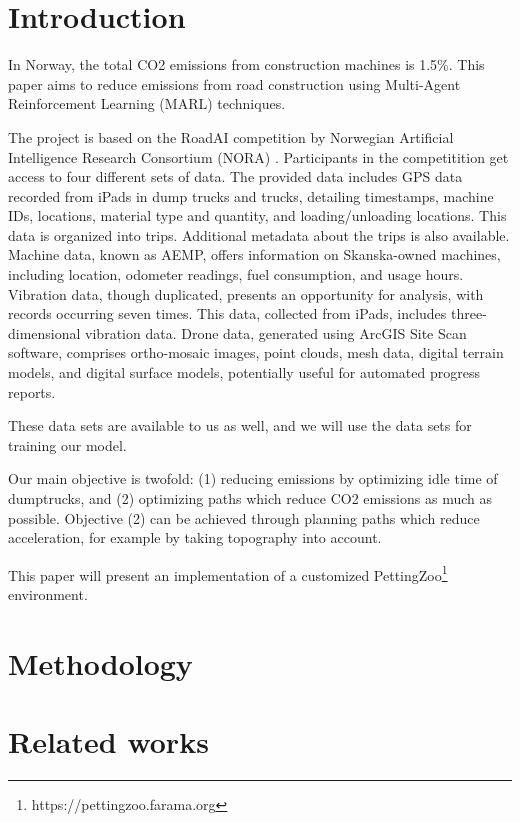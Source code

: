 \documentclass[conference]{IEEEtran}
\begin{document}
\section{Introduction}
In Norway, the total CO2 emissions from construction machines is 1.5\%. \cite{noraRoadAIReducing}
This paper aims to reduce emissions from road construction using Multi-Agent Reinforcement Learning
(MARL) techniques.

The project is based on the RoadAI competition by Norwegian Artificial Intelligence Research
Consortium (NORA) \cite{noraRoadAIReducing}. Participants in the competitition get access to four
different sets of data. The provided data includes GPS data recorded from iPads in dump trucks and
trucks, detailing timestamps, machine IDs, locations, material type and quantity, and loading/unloading
locations. This data is organized into trips. Additional metadata about the trips is also available.
Machine data, known as AEMP, offers information on Skanska-owned machines, including location,
odometer readings, fuel consumption, and usage hours. Vibration data, though duplicated,
presents an opportunity for analysis, with records occurring seven times. This data, collected from
iPads, includes three-dimensional vibration data. Drone data, generated using ArcGIS Site Scan software,
comprises ortho-mosaic images, point clouds, mesh data, digital terrain models, and digital surface models,
potentially useful for automated progress reports.

These data sets are available to us as well, and we will use the data sets for training our model.

Our main objective is twofold: (1) reducing emissions by optimizing idle time of dumptrucks, and (2)
optimizing paths which reduce CO2 emissions as much as possible. Objective (2) can be achieved through
planning paths which reduce acceleration, for example by taking topography into account.

This paper will present an implementation of a customized PettingZoo\footnote{https://pettingzoo.farama.org}
environment.


\section{Methodology}


\section{Related works}
\end{document}
